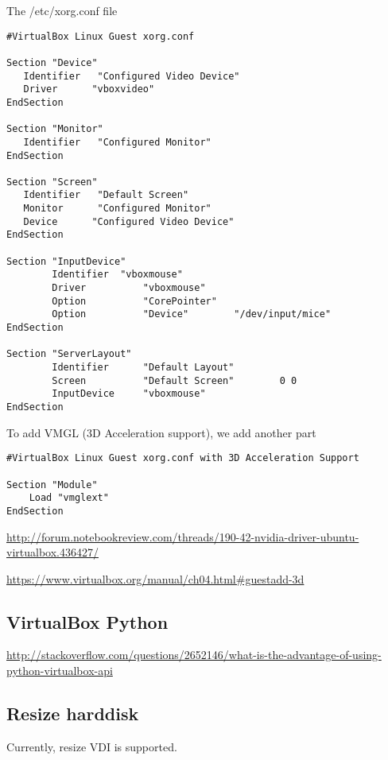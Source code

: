The /etc/xorg.conf file
{\tiny
\begin{verbatim}
#VirtualBox Linux Guest xorg.conf

Section "Device"
   Identifier   "Configured Video Device"
   Driver      "vboxvideo"
EndSection

Section "Monitor"
   Identifier   "Configured Monitor"
EndSection

Section "Screen"
   Identifier   "Default Screen"
   Monitor      "Configured Monitor"
   Device      "Configured Video Device"
EndSection

Section "InputDevice"
        Identifier  "vboxmouse"
        Driver          "vboxmouse"
        Option          "CorePointer"
        Option          "Device"        "/dev/input/mice"
EndSection

Section "ServerLayout"
        Identifier      "Default Layout"
        Screen          "Default Screen"        0 0
        InputDevice     "vboxmouse"
EndSection
\end{verbatim}
}

To add VMGL (3D Acceleration support), we add another part
\begin{verbatim}
#VirtualBox Linux Guest xorg.conf with 3D Acceleration Support

Section "Module"
    Load "vmglext"
EndSection
\end{verbatim}

\url{http://forum.notebookreview.com/threads/190-42-nvidia-driver-ubuntu-virtualbox.436427/}


\url{https://www.virtualbox.org/manual/ch04.html\#guestadd-3d}


\subsection{VirtualBox Python}

\url{http://stackoverflow.com/questions/2652146/what-is-the-advantage-of-using-python-virtualbox-api}

\subsection{Resize harddisk}

Currently, resize VDI is supported.

